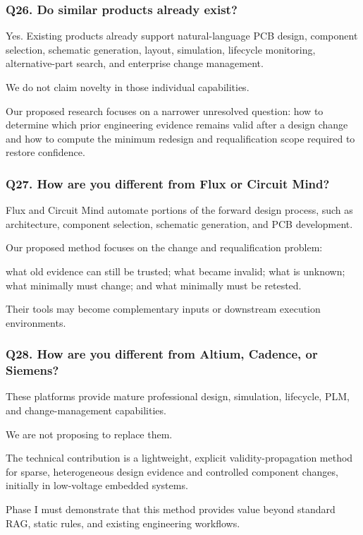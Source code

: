\documentclass[12pt,letterpaper]{article}
\begin{document}
\subsubsection{Q26. Do similar products already exist?}

Yes. Existing products already support natural-language PCB design, component selection, schematic generation, layout, simulation, lifecycle monitoring, alternative-part search, and enterprise change management.

We do not claim novelty in those individual capabilities.

Our proposed research focuses on a narrower unresolved question: how to determine which prior engineering evidence remains valid after a design change and how to compute the minimum redesign and requalification scope required to restore confidence.

\subsubsection{Q27. How are you different from Flux or Circuit Mind?}

Flux and Circuit Mind automate portions of the forward design process, such as architecture, component selection, schematic generation, and PCB development.

Our proposed method focuses on the change and requalification problem:

what old evidence can still be trusted;
what became invalid;
what is unknown;
what minimally must change; and
what minimally must be retested.

Their tools may become complementary inputs or downstream execution environments.

\subsubsection{Q28. How are you different from Altium, Cadence, or Siemens?}

These platforms provide mature professional design, simulation, lifecycle, PLM, and change-management capabilities.

We are not proposing to replace them.

The technical contribution is a lightweight, explicit validity-propagation method for sparse, heterogeneous design evidence and controlled component changes, initially in low-voltage embedded systems.

Phase I must demonstrate that this method provides value beyond standard RAG, static rules, and existing engineering workflows.
\end{document}
